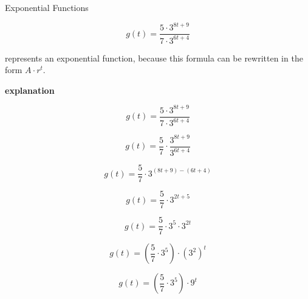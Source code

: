 \documentclass{ximera}
\begin{document}
\begin{example}  Exponential Functions 



\[ g(t) = \frac{5 \cdot 3^{8 t + 9}}{7 \cdot 3^{6 t + 4}} \]

represents an exponential function, because this formula can be rewritten in the form $A \cdot r^t$.   


\textbf{\textcolor{red!75!green}{explanation}} 


\[ g(t) = \frac{5 \cdot 3^{8 t + 9}}{7 \cdot 3^{6 t + 4}} \]



\[ 
g(t) = \frac{5}{7} \cdot \frac{3^{8 t + 9}}{3^{6 t + 4}} 
\]



\[ 
g(t) = \frac{5}{7} \cdot 3^{(8 t + 9)-(6 t + 4)}
\]




\[ 
g(t) = \frac{5}{7} \cdot 3^{2 t + 5}
\]


\[ 
g(t) = \frac{5}{7} \cdot 3^5 \cdot 3^{2 t}
\]



\[ 
g(t) = \left( \frac{5}{7} \cdot 3^5 \right) \cdot (3^2)^t
\]




\[ 
g(t) = \left( \frac{5}{7} \cdot 3^5 \right) \cdot 9^t
\]










\end{example}
\end{document}
